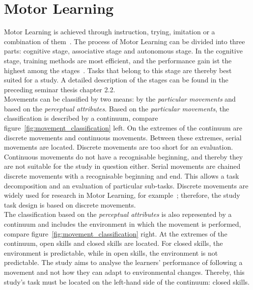 \section{Motor Learning}
\label{section:motor_learning}
Motor Learning is achieved through instruction, trying, imitation or a combination of them~\cite{mlbook}. The process of Motor Learning can be divided into three parts: cognitive stage, associative stage and autonomous stage. In the cognitive stage, training methods are most efficient, and the performance gain ist the highest among the stages~\cite{mlbook}. Tasks that belong to this stage are thereby best suited for a study. A detailed description of the stages can be found in the preceding seminar thesis chapter 2.2.\\
Movements can be classified by two means: by the \textit{particular movements} and based on the \textit{perceptual attributes}. Based on the \textit{particular movements}, the classification is described by a continuum, compare figure~\ref{fig:movement_classification} left. On the extremes of the continuum are discrete movements and continuous movements. Between these extremes, serial movements are located. Discrete movements are too short for an evaluation. Continuous movements do not have a recognisable beginning, and thereby they are not suitable for the study in question either. Serial movements are chained discrete movements with a recognisable beginning and end. This allows a task decomposition and an evaluation of particular sub-tasks. Discrete movements are widely used for research in Motor Learning, for example~\cite{lightguide,mythaichicoaches,elearningma}; therefore, the study task design is based on discrete movements.\\
The classification based on the \textit{perceptual attributes} is also represented by a continuum and includes the environment in which the movement is performed, compare figure~\ref{fig:movement_classification} right. At the extremes of the continuum, open skills and closed skills are located. For closed skills, the environment is predictable, while in open skills, the environment is not predictable. The study aims to analyse the learners' performance of following a movement and not how they can adapt to environmental changes. Thereby, this study's task must be located on the left-hand side of the continuum: closed skills.

